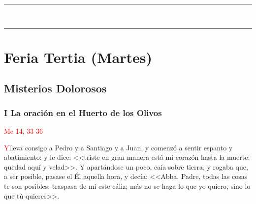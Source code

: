 \documentclass[10pt,twoside]{book}
\begin{document}
\vspace{0.5em}

{}

\vspace{0.5em}

\iralfinal

\vspace{0.5em}

\begin{center}
      \begin{spacing}{0.25}
            {\rule{20em}{0.4pt}}\\
            {\rule{20em}{0.4pt}}
      \end{spacing}
\end{center}


\section*{\centering Feria Tertia (Martes)}

\noindent\subsection*{Misterios Dolorosos}

\noindent\subsubsection*{I La oración en el Huerto de los Olivos}

\vspace{-0.5em}

\hfill\textcolor{red}{Mc 14, 33-36}

\lettrine[lines=2]{\textcolor{red}{Y}}\space lleva consigo a Pedro y a Santiago y a Juan, y comenzó a sentir espanto y abatimiento; y le dice: <<triste en gran manera está mi corazón hasta la muerte;
quedad aquí y velad>>. Y apartándose un poco, caía sobre tierra, y rogaba que, a ser posible, pasase el Él aquella hora, y decía: <<Abba, Padre, todas las cosas te son posibles:
traspasa de mi este cáliz; más no se haga lo que yo quiero, sino lo que tú quieres>>.

\vspace{0.5em}



\vspace{1.5em}
\end{document}
